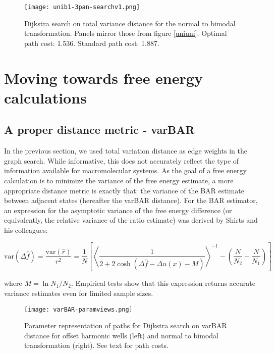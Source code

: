 \begin{figure}
\centering
\texttt{[image: unib1-3pan-searchv1.png]}
\caption[Dijkstra search on total variance distance for the normal to bimodal transformation]{Dijkstra search on total variance distance for the normal to bimodal transformation. Panels mirror those from figure \ref{uniuni}. Optimal path cost: 1.536. Standard path cost: 1.887.}
\label{unibi}
\end{figure}

\section{Moving towards free energy calculations}

\subsection{A proper distance metric - varBAR}

In the previous section, we used total variation distance as edge weights in the graph search. 
While informative, this does not accurately reflect the type of information available for macromolecular systems. 
As the goal of a free energy calculation is to minimize the variance of the free energy estimate, a more appropriate distance metric is exactly that: the variance of the BAR estimate between adjacent states (hereafter the varBAR distance).
For the BAR estimator, an expression for the asymptotic variance of the free energy difference (or equivalently, the relative variance of the ratio estimate) was derived by Shirts and his colleagues\cite{shirts2008statistically, shirts2003equilibrium}:

\begin{equation} \label{eq:varbar}
    \text{var}(\Delta \hat{f}) = \frac{\text{var}(\hat{r})}{r^2} = \frac{1}{N}\left [ \left \langle \frac{1}{2+2\cosh(\Delta \hat{f} - \Delta u(x) -M)} \right \rangle ^{-1} - \left ( \frac{N}{N_2} + \frac{N}{N_1} \right ) \right ]
\end{equation}

\noindent where $M=\ln N_1/N_2$. Empirical tests show that this expression returns accurate variance estimates even for limited sample sizes.%

\begin{figure}
    \centering
    \texttt{[image: varBAR-paramviews.png]}
    \caption[Dijkstra search on varBAR distance]{Parameter representation of paths for Dijkstra search on varBAR distance for offset harmonic wells (left) and normal to bimodal transformation (right). See text for path costs.}
    \label{varbar-paramviews}
\end{figure}

